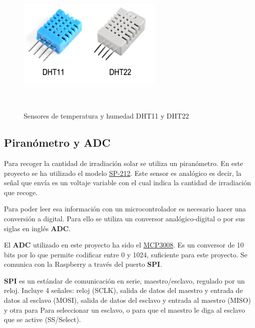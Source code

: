  \begin{figure}[htb]
	
	\begin{center}
		\includegraphics[width=7cm,height=7cm]{figures/sensorTemperaturaHumedad.png}
		\caption{Sensores de temperatura y humedad DHT11 y DHT22}
	\end{center}
	
	\label{sensor}
\end{figure} 

\subsection*{Piranómetro y ADC}
Para recoger la cantidad de irradiación solar se utiliza un piranómetro. En este proyecto se ha utilizado el modelo \href{https://www.apogeeinstruments.co.uk/content/SP-212-215-manual.pdf}{SP-212}. Este sensor es analógico es decir, la señal que envía es un voltaje variable con el cual indica la cantidad de irradiación que recoge.

Para poder leer esa información con un microcontrolador es necesario hacer una conversión a digital. Para ello se utiliza un conversor analógico-digital o por sus siglas en inglés \textbf{ADC}.

El \textbf{ADC} utilizado en este proyecto ha sido el \href{https://cdn-shop.adafruit.com/datasheets/MCP3008.pdf}{MCP3008}. Es un conversor de 10 bits por lo que permite codificar entre 0 y 1024, suficiente para este proyecto. Se comunica con la Raspberry a través del puerto \textbf{SPI}.

\textbf{SPI} es un estándar de comunicación en serie, maestro/esclavo, regulado por un reloj. Incluye 4 señales: reloj (SCLK), salida de datos del maestro y entrada de datos al esclavo (MOSI), salida de datos del esclavo y entrada al maestro (MISO) y otra para Para seleccionar un esclavo, o para que el maestro le diga al esclavo que se active (SS/Select).

